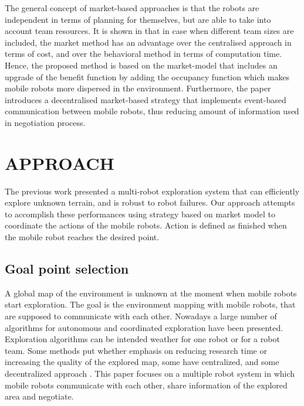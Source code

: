 \documentclass[letterpaper, 10 pt, conference]{ieeeconf}  %
\begin{document}
The general concept of market-based approaches is that the robots are independent in terms of planning for themselves, but are able to take into account team resources. It is shown in \cite{usporedba} that in case when different team sizes are included, the market method has an advantage over the centralised approach in terms of cost, and over the behavioral method in terms of computation time.
Hence, the proposed method is based on the market-model that includes an upgrade of the benefit function by adding the occupancy function which makes mobile robots more dispersed in the environment. Furthermore, the paper introduces a decentralised market-based strategy that implements event-based communication between mobile robots, thus reducing amount of information used in negotiation process. 




\section{APPROACH}
The previous work presented a multi-robot exploration system that can efficiently explore unknown terrain, and is robust to robot failures. Our approach attempts to accomplish these performances using strategy based on market model to coordinate the actions of the mobile robots. Action is defined as finished when the mobile robot reaches the desired point.  

\subsection{Goal point selection}
A global map of the environment is unknown at the moment when mobile robots start exploration. The goal is the environment mapping with mobile robots, that are supposed to communicate with each other. 
Nowadays a large number of algorithms for autonomous and coordinated exploration have been presented. Exploration algorithms can be intended weather for one robot or for a robot team. Some methods put whether emphasis on reducing research time or increasing the quality of the explored map, some have centralized, and some decentralized approach \cite{Julia}. This paper focuses on a multiple robot system in which mobile robots communicate with each other, share information of the explored area and negotiate. 
\end{document}
